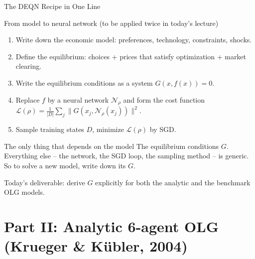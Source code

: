 \documentclass[aspectratio=169,11pt]{beamer}
\newcommand{\emphc}[1]{\textcolor{harvardcrimson}{#1}}
\newcommand{\N}{\mathcal{N}}
\newcommand{\Loss}{\mathcal{L}}
\begin{document}
\begin{frame}{The DEQN Recipe in One Line}
\small
\begin{block}{From model to neural network (to be applied twice in today's lecture)}
\begin{enumerate}\itemsep2pt
    \item Write down the \emphc{economic model}: preferences, technology, constraints, shocks.
    \item Define the \emphc{equilibrium}: choices + prices that satisfy optimization + market clearing.
    \item Write the \emphc{equilibrium conditions} as a system $G(x, f(x)) = 0$.
    \item Replace $f$ by a \emphc{neural network} $\N_\rho$ and form the \emphc{cost function} $\Loss(\rho) = \frac{1}{|D|}\sum_j \|G(x_j, \N_\rho(x_j))\|^2$.
    \item Sample training states $D$, minimize $\Loss(\rho)$ by SGD.
\end{enumerate}
\end{block}

\begin{alertblock}{The only thing that depends on the model}
The \emphc{equilibrium conditions $G$}.  Everything else -- the network, the SGD loop, the sampling method -- is generic.  \emphc{So to solve a new model, write down its $G$.}
\end{alertblock}

\vspace{0.2em}
{\footnotesize Today's deliverable: derive $G$ explicitly for both the analytic and the benchmark OLG models.}
\end{frame}



\section{Part II: Analytic 6-agent OLG (Krueger \& K\"ubler, 2004)}
\end{document}

